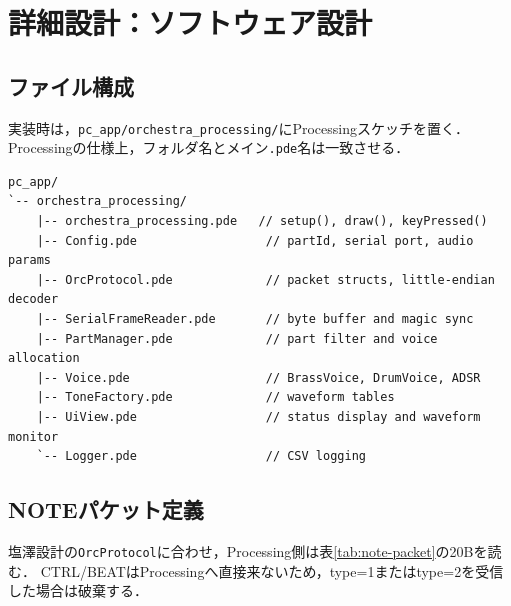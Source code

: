 \documentclass[a4paper,11pt]{jsarticle}
\begin{document}
\newpage
\section{詳細設計：ソフトウェア設計}

\subsection{ファイル構成}

実装時は，\texttt{pc\_app/orchestra\_processing/}にProcessingスケッチを置く．
Processingの仕様上，フォルダ名とメイン\texttt{.pde}名は一致させる．

\begin{lstlisting}[style=textdiagram, caption={Processing実装予定ファイル構成}]
pc_app/
`-- orchestra_processing/
    |-- orchestra_processing.pde   // setup(), draw(), keyPressed()
    |-- Config.pde                  // partId, serial port, audio params
    |-- OrcProtocol.pde             // packet structs, little-endian decoder
    |-- SerialFrameReader.pde       // byte buffer and magic sync
    |-- PartManager.pde             // part filter and voice allocation
    |-- Voice.pde                   // BrassVoice, DrumVoice, ADSR
    |-- ToneFactory.pde             // waveform tables
    |-- UiView.pde                  // status display and waveform monitor
    `-- Logger.pde                  // CSV logging
\end{lstlisting}

\subsection{NOTEパケット定義}

塩澤設計の\texttt{OrcProtocol}に合わせ，Processing側は表\ref{tab:note-packet}の20Bを読む．
CTRL/BEATはProcessingへ直接来ないため，type=1またはtype=2を受信した場合は破棄する．
\end{document}
